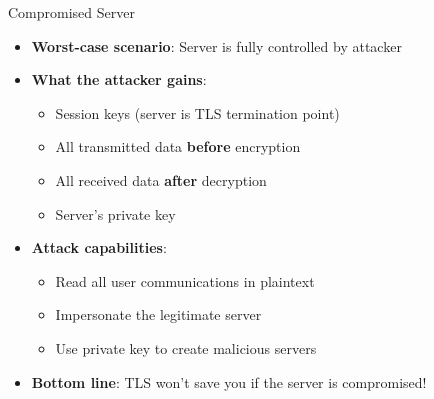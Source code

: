 \documentclass[aspectratio=169, lualatex, handout]{beamer}
\begin{document}
\begin{frame}{Compromised Server}
	\begin{itemize}
		\item \textbf{Worst-case scenario}: Server is fully controlled by attacker
		\item \textbf{What the attacker gains}:
		      \begin{itemize}
			      \item Session keys (server is TLS termination point)
			      \item All transmitted data \textbf{before} encryption
			      \item All received data \textbf{after} decryption
			      \item Server's private key
		      \end{itemize}
		\item \textbf{Attack capabilities}:
		      \begin{itemize}
			      \item Read all user communications in plaintext
			      \item Impersonate the legitimate server
			      \item Use private key to create malicious servers
		      \end{itemize}
		\item \textbf{Bottom line}: TLS won't save you if the server is compromised!
	\end{itemize}
\end{frame}
\end{document}
